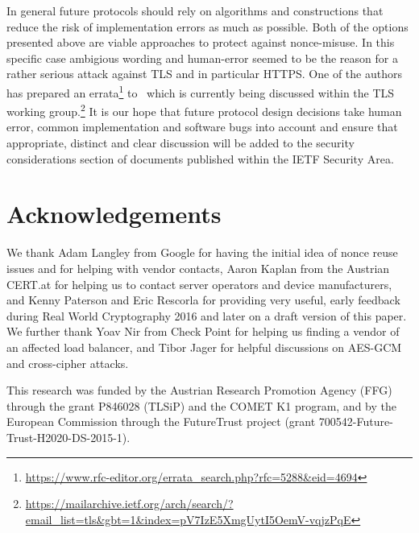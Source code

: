 In general future protocols should rely on algorithms and constructions that reduce the risk of implementation errors as much as possible.
Both of the options presented above are viable approaches to protect against nonce-misuse. In this specific case ambigious wording and human-error seemed to be the reason
for a rather serious attack against TLS and in particular HTTPS. One of the authors has prepared an errata\footnote{\url{https://www.rfc-editor.org/errata_search.php?rfc=5288&eid=4694}} to~\cite{RFC5288} which is currently being discussed within the TLS working group.\footnote{\url{https://mailarchive.ietf.org/arch/search/?email_list=tls&gbt=1&index=pV7IzE5XmgUytI5OemV-vqjzPqE}}
It is our hope that future protocol design decisions take human error, common implementation and software bugs into account and ensure that appropriate, distinct and clear discussion will be added
to the security considerations section of documents published within the IETF Security Area.


\section{Acknowledgements}

We thank Adam Langley from Google for having the initial idea of nonce reuse
issues and for helping with vendor contacts, Aaron Kaplan from the Austrian
CERT.at for helping us to contact server operators and device manufacturers, and
Kenny Paterson and Eric Rescorla for providing very useful, early feedback
during Real World Cryptography 2016 and later on a draft version of this paper.
We further thank Yoav Nir from Check Point for helping us finding a vendor of an
affected load balancer, and Tibor Jager for helpful discussions on AES-GCM and
cross-cipher attacks.


This research was funded by the Austrian Research Promotion Agency (FFG) through the grant P846028 (TLSiP) and the COMET K1 program, and  by the European Commission through the FutureTrust project (grant 700542-Future-Trust-H2020-DS-2015-1).

{
}

